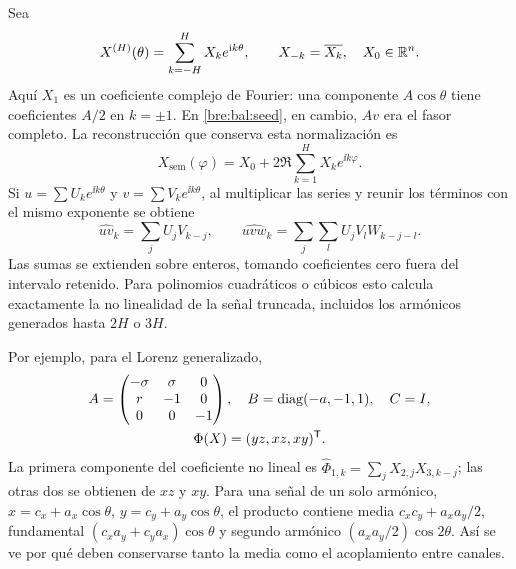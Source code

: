 Sea
\begin{equation}
 X^{(H)}(\theta)=\sum_{k=-H}^{H}X_ke^{\mathrm i k\theta},\qquad
 X_{-k}=\overline{X_k},\quad X_0\in\mathbb R^n.
 \label{bre:bal:fourier-state}
\end{equation}
Aquí \(X_1\) es un coeficiente complejo de Fourier: una componente
\(A\cos\theta\) tiene coeficientes \(A/2\) en \(k=\pm1\).
En \eqref{bre:bal:seed}, en cambio, \(Av\) era el fasor completo.
La reconstrucción que conserva esta normalización es
\begin{equation}
 X_{\mathrm{sem}}(\varphi)=X_0+
       2\Re\sum_{k=1}^{H}X_ke^{\ii k\varphi}.
 \label{bre:bal:mimo-seed}
\end{equation}
Si \(u=\sum U_ke^{\ii k\theta}\) y
\(v=\sum V_ke^{\ii k\theta}\), al multiplicar las series y reunir
los términos con el mismo exponente se obtiene
\begin{equation}
 \widehat{uv}_k=\sum_jU_jV_{k-j},\qquad
 \widehat{uvw}_k=\sum_j\sum_lU_jV_lW_{k-j-l}.
 \label{bre:bal:convolutions}
\end{equation}
Las sumas se extienden sobre enteros, tomando coeficientes cero fuera
del intervalo retenido. Para polinomios cuadráticos o cúbicos esto
calcula exactamente la no linealidad de la señal truncada, incluidos
los armónicos generados hasta \(2H\) o \(3H\).

Por ejemplo, para el Lorenz generalizado,
\begin{equation}
 \begin{gathered}
 A=\begin{pmatrix}-\sigma&\sigma&0\\r&-1&0\\0&0&-1\end{pmatrix},
 \quad B=\operatorname{diag}(-a,-1,1),\quad C=I,\\
 \Phi(X)=(yz,xz,xy)^{\mathsf T}.
 \end{gathered}
 \label{bre:bal:lorenz-mimo}
\end{equation}
La primera componente del coeficiente no lineal es
\(\widehat\Phi_{1,k}=\sum_jX_{2,j}X_{3,k-j}\); las otras dos se
obtienen de \(xz\) y \(xy\). Para una señal de un solo armónico,
\(x=c_x+a_x\cos\theta\), \(y=c_y+a_y\cos\theta\), el producto
contiene media \(c_xc_y+a_xa_y/2\), fundamental
\((c_xa_y+c_ya_x)\cos\theta\) y segundo armónico
\((a_xa_y/2)\cos2\theta\). Así se ve por qué deben conservarse
tanto la media como el acoplamiento entre canales.

